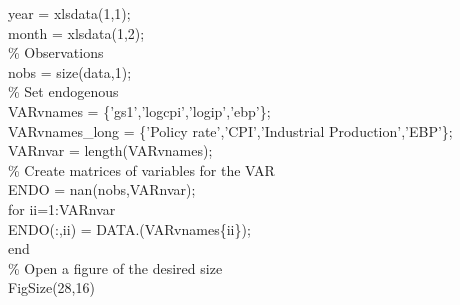\hspace{1mm}year = xlsdata(1,1); \\ 
\hspace{1mm}month = xlsdata(1,2); \\ 
\hspace{1mm}\textcolor{matlabgreen}{\% Observations }\\ 
\hspace{1mm}nobs = size(data,1); \\ 
\hspace{1mm}\textcolor{matlabgreen}{\% Set endogenous }\\ 
\hspace{1mm}VARvnames      = \{\textcolor{matlabpurple}{'gs1'},\textcolor{matlabpurple}{'logcpi'},\textcolor{matlabpurple}{'logip'},\textcolor{matlabpurple}{'ebp'}\}; \\ 
\hspace{1mm}VARvnames\_long = \{\textcolor{matlabpurple}{'Policy rate'},\textcolor{matlabpurple}{'CPI'},\textcolor{matlabpurple}{'Industrial Production'},\textcolor{matlabpurple}{'EBP'}\}; \\ 
\hspace{1mm}VARnvar        = length(VARvnames); \\ 
\hspace{1mm}\textcolor{matlabgreen}{\% Create matrices of variables \textcolor{matlabblue}{for} the VAR }\\ 
\hspace{1mm}\hspace{5mm} ENDO = nan(nobs,VARnvar); \\ 
\hspace{1mm}\hspace{5mm} \textcolor{matlabblue}{for} ii=1:VARnvar \\ 
\hspace{1mm}\hspace{5mm} \hspace{5mm} ENDO(:,ii) = DATA.(VARvnames\{ii\}); \\ 
\hspace{1mm}\hspace{5mm} \textcolor{matlabblue}{end} \\ 
\hspace{1mm}\hspace{5mm} \textcolor{matlabgreen}{\% Open a figure of the desired size }\\ 
\hspace{1mm}\hspace{5mm} FigSize(28,16) \\ 

